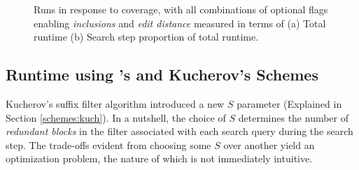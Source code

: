 \begin{figure}[!htb]
\centering
{}
\caption[Runtime and runtime proportion of runs in response to coverage, with all combinations of optional flags enabling \textit{inclusions} and \textit{edit distance}.]{Runs in response to coverage, with all combinations of optional flags enabling \textit{inclusions} and \textit{edit distance} measured in terms of (a) Total runtime (b) Search step proportion of total runtime.}
\label{fig:extensions}
\end{figure}


\subsection{Runtime using \vali{}'s and Kucherov's Schemes}

Kucherov's \gls{suffix filter} algorithm introduced a new $S$ parameter (Explained in Section \ref{schemes:kuch}). In a nutshell, the choice of $S$ determines the number of \textit{redundant blocks} in the \gls{filter} associated with each search \gls{query} during the \gls{search step}. The trade-offs evident from choosing some $S$ over another yield an optimization problem, the nature of which is not immediately intuitive. 

